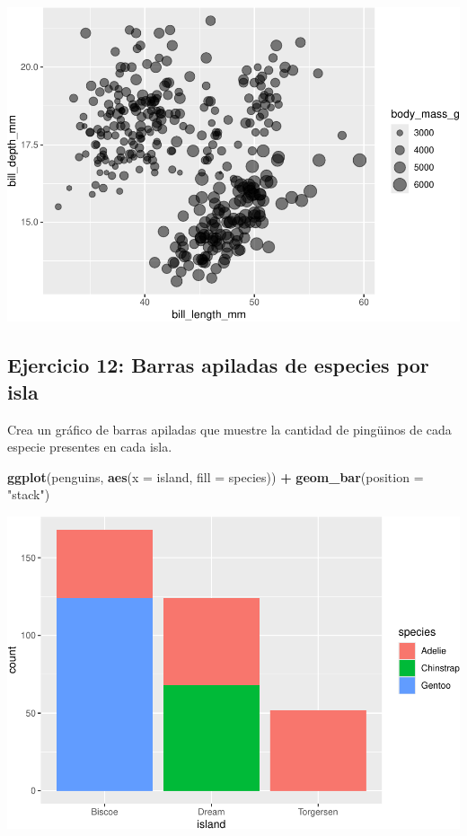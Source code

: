 \documentclass[
]{book}
\newenvironment{Shaded}{\begin{snugshade}}{\end{snugshade}}
\newcommand{\AttributeTok}[1]{\textcolor[rgb]{0.13,0.29,0.53}{#1}}
\newcommand{\FunctionTok}[1]{\textcolor[rgb]{0.13,0.29,0.53}{\textbf{#1}}}
\newcommand{\NormalTok}[1]{#1}
\newcommand{\SpecialCharTok}[1]{\textcolor[rgb]{0.81,0.36,0.00}{\textbf{#1}}}
\newcommand{\StringTok}[1]{\textcolor[rgb]{0.31,0.60,0.02}{#1}}
\begin{document}
\includegraphics{bookdown-demo_files/figure-latex/unnamed-chunk-187-1.pdf}

\hypertarget{ejercicio-12-barras-apiladas-de-especies-por-isla}{%
\subsection{Ejercicio 12: Barras apiladas de especies por isla}\label{ejercicio-12-barras-apiladas-de-especies-por-isla}}

Crea un gráfico de barras apiladas que muestre la cantidad de pingüinos de cada especie presentes en cada isla.

\begin{Shaded}
\begin{Highlighting}[]
\FunctionTok{ggplot}\NormalTok{(penguins, }\FunctionTok{aes}\NormalTok{(}\AttributeTok{x =}\NormalTok{ island, }\AttributeTok{fill =}\NormalTok{ species)) }\SpecialCharTok{+}
  \FunctionTok{geom\_bar}\NormalTok{(}\AttributeTok{position =} \StringTok{"stack"}\NormalTok{)}
\end{Highlighting}
\end{Shaded}

\includegraphics{bookdown-demo_files/figure-latex/unnamed-chunk-188-1.pdf}
\end{document}
